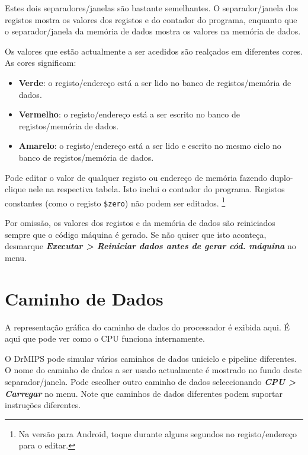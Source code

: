 \documentclass[11pt,a4paper,twoside,titlepage]{report}
\newcommand{\menupath}[1]{\textbf{\emph{#1}}}
\begin{document}
Estes dois separadores/janelas são bastante semelhantes.
O separador/janela dos registos mostra os valores dos registos e do contador do
programa, enquanto que o separador/janela da memória de dados mostra os valores
na memória de dados.

Os valores que estão actualmente a ser acedidos são realçados em diferentes 
cores. As cores significam:
\begin{itemize}
	\item \textbf{Verde}: o registo/endereço está a ser lido no banco de
		registos/memória de dados.
	\item \textbf{Vermelho}: o registo/endereço está a ser escrito no banco de
		registos/memória de dados.
	\item \textbf{Amarelo}: o registo/endereço está a ser lido e escrito no mesmo
		ciclo no banco de registos/memória de dados.
\end{itemize}

Pode editar o valor de qualquer registo ou endereço de memória fazendo 
duplo-clique nele na respectiva tabela. Isto inclui o contador do programa.
Registos constantes (como o registo \verb+$zero+) não podem ser editados.
\footnote{Na versão para Android, toque durante alguns segundos no
registo/endereço para o editar.}

Por omissão, os valores dos registos e da memória de dados são reiniciados
sempre que o código máquina é gerado.
Se não quiser que isto aconteça, desmarque 
\menupath{Executar > Reiniciar dados antes de gerar cód. máquina} no menu.


\section{Caminho de Dados}

A representação gráfica do caminho de dados do processador é exibida aqui.
É aqui que pode ver como o CPU funciona internamente.

O DrMIPS pode simular vários caminhos de dados uniciclo e pipeline diferentes.
O nome do caminho de dados a ser usado actualmente é mostrado no fundo deste
separador/janela. Pode escolher outro caminho de dados seleccionando
\menupath{CPU > Carregar} no menu.
Note que caminhos de dados diferentes podem suportar instruções diferentes.
\end{document}
